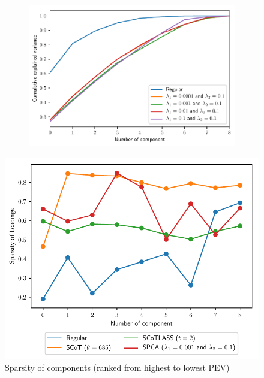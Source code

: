 \documentclass[11pt,letterpaper]{report}
\begin{document}
\begin{figure}
\begin{center}
\begin{subfigure}[H!]{0.49\textwidth}
    \includegraphics[scale = 0.5]{"../Figures/SPCA_comparison.pdf"}
\end{subfigure}    
\end{center}
\end{figure}

\begin{figure}[htpb!]\centering
    \caption{Sparsity of components (ranked from highest to lowest PEV)}
    \label{fig:sparComp}
    \includegraphics[scale = 0.5]{"../Figures/sparsityOfComponents.pdf"}
\end{figure}
\end{document}

